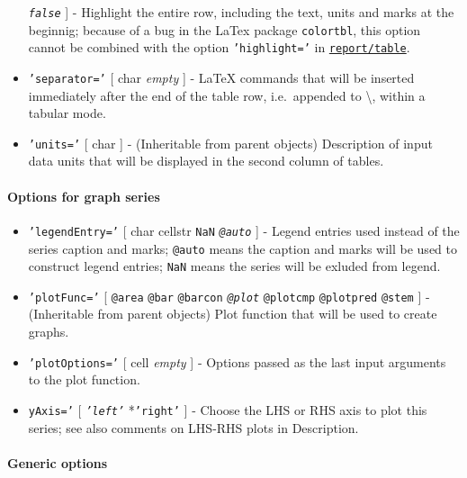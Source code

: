 \begin{itemize}
  \emph{\texttt{false}} {]} - Highlight the entire row, including the
  text, units and marks at the beginnig; because of a bug in the LaTex
  package \texttt{colortbl}, this option cannot be combined with the
  option \texttt{'highlight='} in
  \href{report/table}{\texttt{report/table}}.
\item
  \texttt{'separator='} {[} char \textbar{} \emph{empty} {]} - LaTeX
  commands that will be inserted immediately after the end of the table
  row, i.e.~appended to \textbackslash{}, within a tabular mode.
\item
  \texttt{'units='} {[} char {]} - (Inheritable from parent objects)
  Description of input data units that will be displayed in the second
  column of tables.
\end{itemize}

\paragraph{Options for graph series}

\begin{itemize}
\item
  \texttt{'legendEntry='} {[} char \textbar{} cellstr \textbar{}
  \texttt{NaN} \textbar{} \emph{\texttt{@auto}} {]} - Legend entries
  used instead of the series caption and marks; \texttt{@auto} means the
  caption and marks will be used to construct legend entries;
  \texttt{NaN} means the series will be exluded from legend.
\item
  \texttt{'plotFunc='} {[} \texttt{@area} \textbar{} \texttt{@bar}
  \textbar{} \texttt{@barcon} \textbar{} \emph{\texttt{@plot}}
  \textbar{} \texttt{@plotcmp} \textbar{} \texttt{@plotpred} \textbar{}
  \texttt{@stem} {]} - (Inheritable from parent objects) Plot function
  that will be used to create graphs.
\item
  \texttt{'plotOptions='} {[} cell \textbar{} \emph{empty} {]} - Options
  passed as the last input arguments to the plot function.
\item
  \texttt{yAxis='} {[} \emph{\texttt{'left'}} \textbar{}
  *\texttt{'right'} {]} - Choose the LHS or RHS axis to plot this
  series; see also comments on LHS-RHS plots in Description.
\end{itemize}

\paragraph{Generic options}

